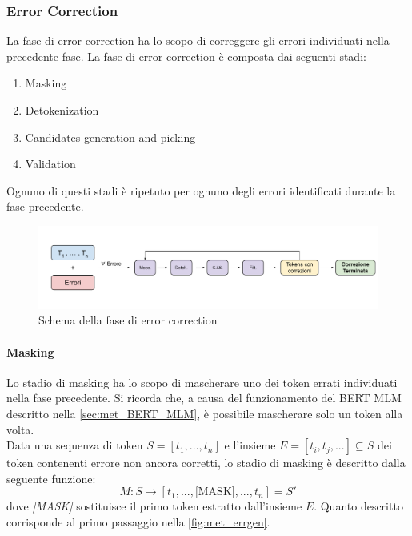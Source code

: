 \subsubsection{Error Correction}
\label{sec:met_errcor}

La fase di error correction ha lo scopo di correggere gli errori individuati nella precedente fase. La fase di error correction è composta dai seguenti stadi:

\begin{enumerate}
\item Masking
\item Detokenization
\item Candidates generation and picking
\item Validation
\end{enumerate}

Ognuno di questi stadi è ripetuto per ognuno degli errori identificati durante la fase precedente.

\begin{figure}[H]
\centering
\includegraphics[width=\textwidth]{immagini/metodologia/tok_correction}
\caption{Schema della fase di error correction}
\label{fig:met_tok_correction}
\end{figure}



\paragraph{Masking}
Lo stadio di masking ha lo scopo di mascherare uno dei token errati individuati nella fase precedente. Si ricorda che, a causa del funzionamento del BERT MLM descritto nella \autoref{sec:met_BERT_MLM}, è possibile mascherare solo un token alla volta.\\
Data una sequenza di token $S = [t_1,...,t_n]$ e l'insieme $E = [t_i,t_j,...]\subseteq S$ dei token contenenti errore non ancora corretti, lo stadio di masking è descritto dalla seguente funzione:
\begin{equation}
M: S \rightarrow [t_1,...,\text{[MASK]},...,t_n] = S\prime
\end{equation}
dove \textit{[MASK]} sostituisce il primo token estratto dall'insieme $E$. Quanto descritto corrisponde al primo passaggio nella \autoref{fig:met_errgen}.


